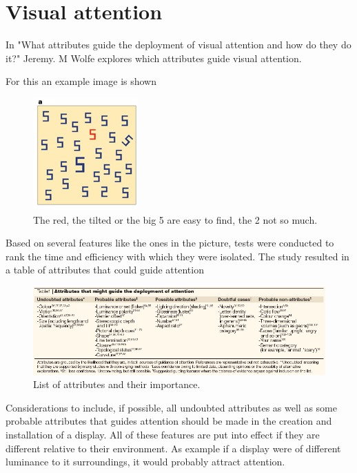 \cite{interactivePublicDisplaysKinect}

\section{Visual attention}\label{sec:visualAttention}

In "What attributes guide the deployment of visual attention and how do they do it?" Jeremy. M Wolfe explores which attributes guide visual attention\cite{Wolfe2004}.

For this an example image is shown
\begin{figure}[H]
    	\centering
    	\includegraphics[width=0.4\linewidth]{figure/Analysis/natureFig1.png}
    	\caption{The red, the tilted or the big 5 are easy to find, the 2 not so much\cite{Wolfe2004}.}
    	\label{fig:hard2find}
    \end{figure}

Based on several features like the ones in the picture, tests were conducted to rank the time and efficiency with which they were isolated. The study resulted in a table of attributes that could guide attention

\begin{figure}[H]
    	\centering
    	\includegraphics[width=0.9\linewidth]{figure/Analysis/attributes2find.png}
    	\caption{List of attributes and their importance\cite{Wolfe2004}.}
    	\label{fig:attributes2find}
    \end{figure}
Considerations to include, if possible, all undoubted attributes as well as some probable attributes that guides attention should be made in the creation and installation of a display. All of these features are put into effect if they are different relative to their environment. As example if a display were of different luminance to it surroundings, it would probably attract attention.

